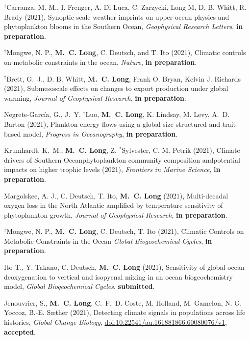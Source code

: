 \documentclass[11pt]{article}
\newcommand{\doi}[1]{\href{http://dx.doi.org/#1}{doi:#1}}
\begin{document}
\begin{thebibliography}{99}

$^\dagger$Carranza,	M. M., I. Frenger,	A. Di Luca,	C. Zarzycki, Long	M, D. B. Whitt, R. Brady (2021),
Synoptic-scale weather imprints on upper ocean physics and phytoplankton blooms	in the Southern	Ocean,
\textit{Geophysical	Research Letters},
\textbf{in preparation}.

$^\dagger$Mongwe, N. P., \textbf{M.~C. {Long}}, C. Deutsch, and T. Ito (2021), Climatic controls on metabolic constraints in the ocean,
\textit{Nature},
\textbf{in preparation}.

$^\dagger$Brett, G.~J., D. B. Whitt, \textbf{M.~C. {Long}}, Frank O. Bryan, Kelvin J. Richards (2021), Submesoscale effects on changes to export production under global warming,
\textit{Journal of Geophysical Research},
\textbf{in preparation}.

Negrete-García, G., J.~Y. $^\dagger$Luo, \textbf{M.~C. {Long}}, K. Lindsay, M. Levy, A.~D. Barton (2021), Plankton energy flows using a global size-structured and trait-based model,
\textit{Progress in Oceanography},
\textbf{in preparation}.

Krumhardt, K.~M., \textbf{M.~C. {Long}}, Z. $^*$Sylvester, C. M. Petrik (2021),
Climate drivers of Southern Oceanphytoplankton community composition andpotential impacts on higher trophic levels (2021),
\textit{Frontiers in Marine Science},
\textbf{in preparation}.

Margolskee, A. J., C. Deutsch, T. Ito, \textbf{M.~C. {Long}} (2021),
Multi-decadal oxygen loss in the North Atlantic amplified by temperature sensitivity of phytoplankton growth,
\textit{Journal of Geophysical Research},
\textbf{in preparation}.

$^\dagger$Mongwe, N. P., \textbf{M.~C. {Long}}, C. Deutsch, T. Ito (2021),
Climatic Controls on Metabolic Constraints in the Ocean
\textit{Global Biogeochemical Cycles},
\textbf{in preparation}.

Ito T., Y. Takano, C. Deutsch, \textbf{M.~C. {Long}} (2021),
Sensitivity of global ocean deoxygenation to vertical and isopycnal mixing in an ocean biogeochemistry model,
\textit{Global Biogeochemical Cycles},
\textbf{submitted}.

Jenouvrier, S., \textbf{M.~C. {Long}}, C.~F.~D. Coste,
M. Holland, M. Gamelon, N. G. Yoccoz, B.-E. Sæther (2021),
Detecting climate signals in populations across life histories,
\textit{Global Change Biology},
\doi{10.22541/au.161881866.60080076/v1},
\textbf{accepted}.


\end{thebibliography}
\end{document}
